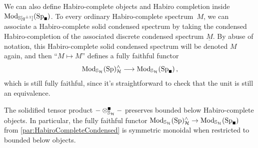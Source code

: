 \documentclass[DIV=12,numbers=enddot,leqno,bibliography=totoc]{scrartcl}
\begin{document}
	\begin{numpar}\label{par:HabiroCompleteCondensed}
		We can also define Habiro-complete objects and Habiro completion inside $\Mod_{\IS[q^{\pm 1}]}(\Sp_\solid)$. To every ordinary Habiro-complete spectrum~$M$, we can associate a Habiro-complete solid condensed spectrum by taking the condensed Habiro-completion of the associated discrete condensed spectrum $\underline{M}$. By abuse of notation, this Habiro-complete solid condensed spectrum will be denoted $M$ again, and then \enquote{$M\mapsto M$} defines a fully faithful functor
		\begin{equation*}
			\Mod_{\IS_\Hh}(\Sp)_\Hh^\complete\longrightarrow \Mod_{\IS_\Hh}(\Sp_\solid)\,,
		\end{equation*}
		which is still fully faithful, since it's straightforward to check that the unit is still an equivalence.
	\end{numpar}
	\begin{lem}\label{lem:SolidTensorProductHabiroComplete}
		The solidified tensor product $-\soltimes_{\IS_\Hh}-$ preserves bounded below Habiro-complete objects. In particular, the fully faithful functor $\Mod_{\IS_\Hh}(\Sp)_\Hh^\complete\rightarrow \Mod_{\IS_\Hh}(\Sp_\solid)$ from \cref{par:HabiroCompleteCondensed} is symmetric monoidal when restricted to bounded below objects.
	\end{lem}
\end{document}
